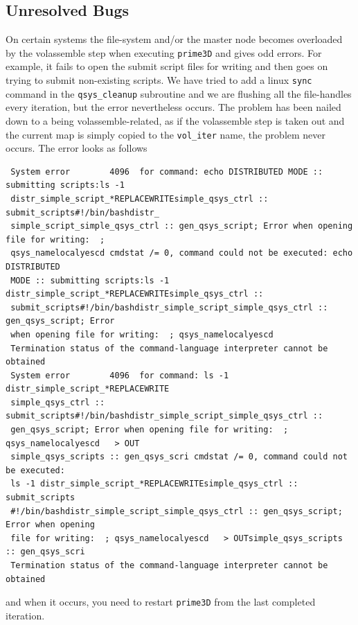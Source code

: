 \documentclass[a4paper,11pt]{article}
\newcommand{\prgname}[1]{\textcolor{NavyBlue}{\texttt{#1}}}
\begin{document}
\subsection{Unresolved Bugs}
On certain systems the file-system and/or the master node becomes overloaded by the volassemble step when executing \prgname{prime3D} and gives odd errors. For example, it fails to open the submit script files for writing and then goes on trying to submit non-existing scripts. We have tried to add a linux \texttt{sync} command in the \texttt{qsys\_cleanup} subroutine and we are flushing all the file-handles every iteration, but the error nevertheless occurs. The problem has been nailed down to a being volassemble-related, as if the volassemble step is taken out and the current map is simply copied to the \texttt{vol\_iter} name, the problem never occurs. The error looks as follows
\begin{verbatim}
 System error        4096  for command: echo DISTRIBUTED MODE :: submitting scripts:ls -1  
 distr_simple_script_*REPLACEWRITEsimple_qsys_ctrl :: submit_scripts#!/bin/bashdistr_
 simple_script_simple_qsys_ctrl :: gen_qsys_script; Error when opening file for writing:  ;  
 qsys_namelocalyescd cmdstat /= 0, command could not be executed: echo DISTRIBUTED  
 MODE :: submitting scripts:ls -1 distr_simple_script_*REPLACEWRITEsimple_qsys_ctrl :: 
 submit_scripts#!/bin/bashdistr_simple_script_simple_qsys_ctrl :: gen_qsys_script; Error 
 when opening file for writing:  ; qsys_namelocalyescd
 Termination status of the command-language interpreter cannot be obtained
 System error        4096  for command: ls -1 distr_simple_script_*REPLACEWRITE
 simple_qsys_ctrl :: submit_scripts#!/bin/bashdistr_simple_script_simple_qsys_ctrl :: 
 gen_qsys_script; Error when opening file for writing:  ; qsys_namelocalyescd   > OUT
 simple_qsys_scripts :: gen_qsys_scri cmdstat /= 0, command could not be executed: 
 ls -1 distr_simple_script_*REPLACEWRITEsimple_qsys_ctrl :: submit_scripts
 #!/bin/bashdistr_simple_script_simple_qsys_ctrl :: gen_qsys_script; Error when opening 
 file for writing:  ; qsys_namelocalyescd   > OUTsimple_qsys_scripts :: gen_qsys_scri
 Termination status of the command-language interpreter cannot be obtained
\end{verbatim}
and when it occurs, you need to restart \prgname{prime3D} from the last completed iteration.
\end{document}
